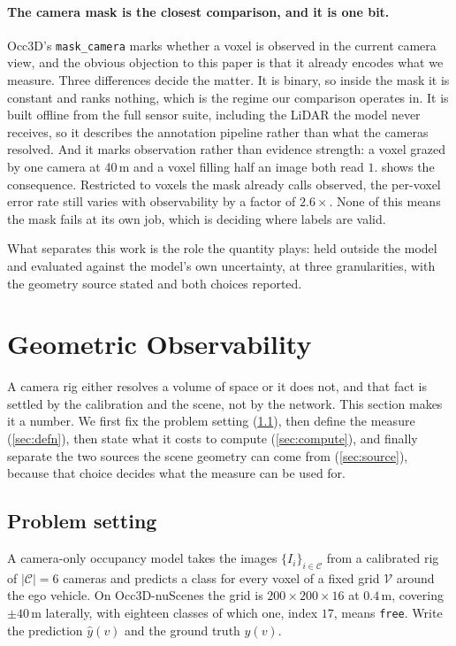 \documentclass[10pt,twocolumn,letterpaper]{article}
\newcommand{\nMvoRatio}{$2.6\times$}
\begin{document}
\paragraph{The camera mask is the closest comparison, and it is one bit.}
Occ3D's \texttt{mask\_camera} marks whether a voxel is observed in the
current camera view, and the obvious objection to this paper is that it
already encodes what we measure. Three differences decide the matter. It
is binary, so inside the mask it is constant and ranks nothing, which is
the regime our comparison operates in. It is built offline from the full
sensor suite, including the LiDAR the model never receives, so it
describes the annotation pipeline rather than what the cameras resolved.
And it marks observation rather than evidence strength: a voxel grazed by
one camera at 40\,m and a voxel filling half an image both read $1$.
 shows the consequence. Restricted to voxels the mask
already calls observed, the per-voxel error rate still varies with
observability by a factor of \nMvoRatio. None of this means the mask fails
at its own job, which is deciding where labels are valid.

What separates this work is the role the quantity plays: held outside the
model and evaluated against the model's own uncertainty, at three
granularities, with the geometry source stated and both choices reported.

\section{Geometric Observability}

A camera rig either resolves a volume of space or it does not, and that
fact is settled by the calibration and the scene, not by the network. This
section makes it a number. We first fix the problem setting
(\cref{sec:prelim}), then define the measure (\cref{sec:defn}), then state
what it costs to compute (\cref{sec:compute}), and finally separate the two
sources the scene geometry can come from (\cref{sec:source}), because that
choice decides what the measure can be used for.

\subsection{Problem setting}
\label{sec:prelim}
A camera-only occupancy model takes the images $\{I_i\}_{i\in\mathcal{C}}$
from a calibrated rig of $|\mathcal{C}|=6$ cameras and predicts a class for
every voxel of a fixed grid $\mathcal{V}$ around the ego vehicle. On
Occ3D-nuScenes the grid is $200\times200\times16$ at $0.4$\,m, covering
$\pm40$\,m laterally, with eighteen classes of which one, index $17$,
means \texttt{free}. Write the prediction $\hat{y}(v)$ and the
ground truth $y(v)$.
\end{document}
